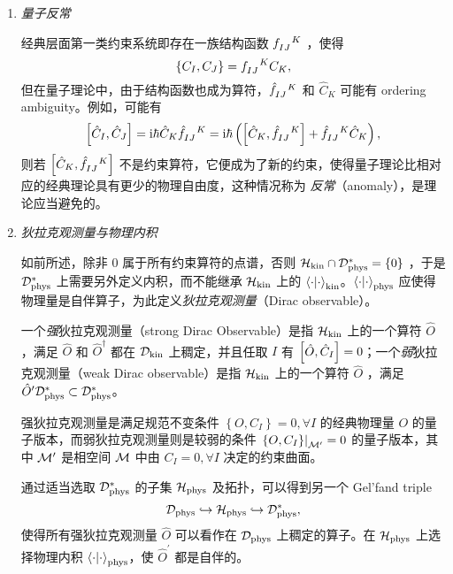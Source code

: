 \begin{enumerate}
			\item \emph{量子反常}
			
					经典层面第一类约束系统即存在一族结构函数 $\tensor{f}{_I_J^K}$ ，使得
					\begin{equation}
						\left\{ C_I, C_J \right\} = \tensor{f}{_I_J^K} C_K,
					\end{equation}
					但在量子理论中，由于结构函数也成为算符，$\tensor{\hat{f}}{_I_J^K}$ 和 $\hat{C}_K$ 可能有 ordering ambiguity。例如，可能有
					\begin{equation}
						\comm{\hat{C}_I}{\hat{C}_J} = \ii\hbar \hat{C}_K \tensor{\hat{f}}{_I_J^K} = \ii\hbar \left( \comm{\hat{C}_K}{\tensor{\hat{f}}{_I_J^K}} + \tensor{\hat{f}}{_I_J^K} \hat{C}_K \right),
					\end{equation}
					则若 $\comm{\hat{C}_K}{\tensor{\hat{f}}{_I_J^K}}$ 不是约束算符，它便成为了新的约束，使得量子理论比相对应的经典理论具有更少的物理自由度，这种情况称为 \emph{反常}（anomaly），是理论应当避免的。

			\item \emph{狄拉克观测量与物理内积}
			
					如前所述，除非 $0$ 属于所有约束算符的点谱，否则 $\mathcal{H}_{\text{kin}} \cap \mathcal{D}_{\text{phys}}^* = \left\{ 0 \right\}$ ，于是 $\mathcal{D}_{\text{phys}}^*$ 上需要另外定义内积，而不能继承 $\mathcal{H}_{\text{kin}}$ 上的 $\ip{\cdot}_{\text{kin}}$。$\ip{\cdot}_{\text{phys}}$ 应使得物理量是自伴算子，为此定义\emph{狄拉克观测量}（Dirac observable）。 
					\begin{Definition}
						一个\emph{强}狄拉克观测量（strong Dirac Observable）是指 $\mathcal{H}_{\text{kin}}$ 上的一个算符 $\hat{O}$ ，满足 $\hat{O}$ 和 $\hat{O}^\dagger$ 都在 $\mathcal{D}_{\text{kin}}$ 上稠定，并且任取 $I$ 有 $\comm{\hat{O}}{\hat{C}_I} = 0$；一个\emph{弱}狄拉克观测量（weak Dirac observable）是指 $\mathcal{H}_{\text{kin}}$ 上的一个算符 $\hat{O}$ ，满足 $\hat{O}^\prime \mathcal{D}_{\text{phys}}^* \subset \mathcal{D}_{\text{phys}}^*$。
					\end{Definition}
					强狄拉克观测量是满足规范不变条件 $\left\{ O, C_I \right\} = 0, \forall I$ 的经典物理量 $O$ 的量子版本，而弱狄拉克观测量则是较弱的条件 $\left. \left\{ O, C_I \right\} \right|_{{\mathcal{M}^\prime}} =0$ 的量子版本，其中 $\mathcal{M}^\prime$ 是相空间 $\mathcal{M}$ 中由 $C_I = 0, \forall I$ 决定的约束曲面。 

					通过适当选取 $\mathcal{D}_{\text{phys}}^*$ 的子集 $\mathcal{H}_{\text{phys}}$ 及拓扑，可以得到另一个 Gel'fand triple
					\begin{equation}
						\mathcal{D}_{\text{phys}} \hookrightarrow \mathcal{H}_{\text{phys}} \hookrightarrow \mathcal{D}_{\text{phys}}^*,
					\end{equation}
					使得所有强狄拉克观测量 $\hat{O}$ 可以看作在 $\mathcal{D}_{\text{phys}}$ 上稠定的算子。在 $\mathcal{H}_{\text{phys}}$ 上选择物理内积 $\ip{\cdot	}_{\text{phys}}$，使 $\hat{O}^\prime$ 都是自伴的。


\end{enumerate}
